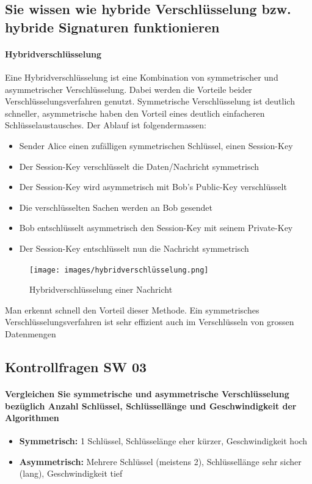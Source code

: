 \documentclass[10pt,a4paper]{article}
\begin{document}
\subsection*{Sie wissen wie hybride Verschlüsselung bzw. hybride Signaturen funktionieren}
\paragraph*{Hybridverschlüsselung}Eine Hybridverschlüsselung ist eine Kombination von symmetrischer und asymmetrischer Verschlüsselung. Dabei werden die Vorteile beider Verschlüsselungsverfahren genutzt. Symmetrische Verschlüsselung ist deutlich schneller, asymmetrische haben den Vorteil eines deutlich einfacheren Schlüsselaustausches. Der Ablauf ist folgendermassen:
\begin{itemize}[noitemsep,topsep=0pt,leftmargin=*]
    \item Sender Alice einen zufälligen symmetrischen Schlüssel, einen Session-Key
    \item Der Session-Key verschlüsselt die Daten/Nachricht symmetrisch
    \item Der Session-Key wird asymmetrisch mit Bob's Public-Key verschlüsselt
    \item Die verschlüsselten Sachen werden an Bob gesendet
    \item Bob entschlüsselt asymmetrisch den Session-Key mit seinem Private-Key
    \item Der Session-Key entschlüsselt nun die Nachricht symmetrisch
\end{itemize}
\begin{figure}[H]
    \begin{center}
    \texttt{[image: images/hybridverschlüsselung.png]}
    \caption{Hybridverschlüsselung einer Nachricht}
    \label{hybrid}
    \end{center}
\end{figure}
Man erkennt schnell den Vorteil dieser Methode. Ein symmetrisches Verschlüsselungsverfahren ist sehr effizient auch im Verschlüsseln von grossen Datenmengen

\subsection*{Kontrollfragen SW 03}

\paragraph*{Vergleichen Sie symmetrische und asymmetrische Verschlüsselung bezüglich Anzahl Schlüssel, Schlüssellänge und Geschwindigkeit der Algorithmen}
\begin{itemize}[noitemsep,topsep=0pt,leftmargin=*]
    \item \textbf{Symmetrisch:} 1 Schlüssel, Schlüsselänge eher kürzer, Geschwindigkeit hoch
    \item \textbf{Asymmetrisch:} Mehrere Schlüssel (meistens 2), Schlüssellänge sehr sicher (lang), Geschwindigkeit tief
\end{itemize}
\end{document}

